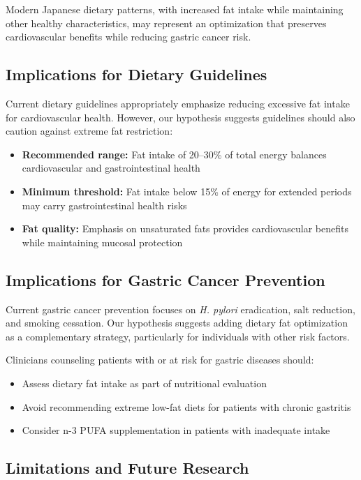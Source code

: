 \documentclass[review]{elsarticle}
\begin{document}
Modern Japanese dietary patterns, with increased fat intake while maintaining other healthy characteristics, may represent an optimization that preserves cardiovascular benefits while reducing gastric cancer risk.

\subsection{Implications for Dietary Guidelines}

Current dietary guidelines appropriately emphasize reducing excessive fat intake for cardiovascular health. However, our hypothesis suggests guidelines should also caution against extreme fat restriction:

\begin{itemize}
    \item \textbf{Recommended range:} Fat intake of 20--30\% of total energy balances cardiovascular and gastrointestinal health
    \item \textbf{Minimum threshold:} Fat intake below 15\% of energy for extended periods may carry gastrointestinal health risks
    \item \textbf{Fat quality:} Emphasis on unsaturated fats provides cardiovascular benefits while maintaining mucosal protection
\end{itemize}

\subsection{Implications for Gastric Cancer Prevention}

Current gastric cancer prevention focuses on \textit{H. pylori} eradication, salt reduction, and smoking cessation. Our hypothesis suggests adding dietary fat optimization as a complementary strategy, particularly for individuals with other risk factors.

Clinicians counseling patients with or at risk for gastric diseases should:
\begin{itemize}
    \item Assess dietary fat intake as part of nutritional evaluation
    \item Avoid recommending extreme low-fat diets for patients with chronic gastritis
    \item Consider n-3 PUFA supplementation in patients with inadequate intake
\end{itemize}

\subsection{Limitations and Future Research}
\end{document}
